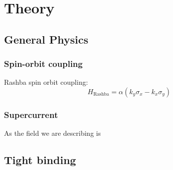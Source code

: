 \newcommand{\kx}{k_x}
\newcommand{\ky}{k_y}

\newcommand{\sigx}{\sigma_x}
\newcommand{\sigy}{\sigma_y}
\newcommand{\sigz}{\sigma_z}
\newcommand{\sigi}{\sigma_0}
\newcommand{\taux}{\tau_x}
\newcommand{\tauy}{\tau_y}
\newcommand{\tauz}{\tau_z}
\newcommand{\taui}{\tau_0}
\chapter{Theory}

\section{General Physics}
    \subsection{Spin-orbit coupling}
    Rashba spin orbit coupling:
    \begin{equation}
    	H_\text{Rashba} = \alpha (\ky \sigx - \kx \sigy) 
    \end{equation}

    \subsection{Supercurrent}
    As the field we are describing is 





\section{Tight binding}




